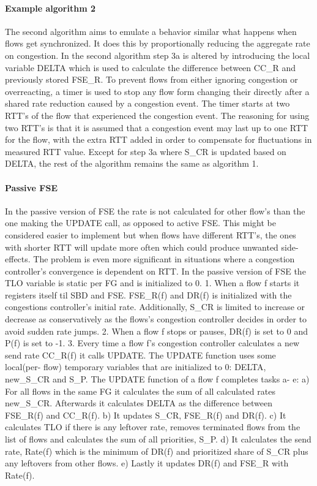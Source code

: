 \documentclass[UKenglish]{ifimaster}
\begin{document}
\paragraph{Example algorithm 2}
The second algorithm aims to emulate a behavior similar what happens when flows get synchronized.
It does this by proportionally reducing the aggregate rate on congestion.
In the second algorithm step 3a is altered by introducing the local variable DELTA which is used to calculate the difference between CC\_R and previously stored FSE\_R. 
To prevent flows from either ignoring congestion or overreacting, a timer is used to stop any flow form changing their directly after a shared rate reduction caused by a congestion event. 
The timer starts at two RTT's of the flow that experienced the congestion event.
The reasoning for using two RTT's is that it is assumed that a congestion event may last up to one RTT for the flow, with the extra RTT added in order to compensate for fluctuations in measured RTT value.
Except for step 3a where S\_CR is updated based on DELTA, the rest of the algorithm remains the same as algorithm 1.

\paragraph{Passive FSE}
In the passive version of FSE the rate is not calculated for other flow's than the one making the UPDATE call, as opposed to active FSE.
This might be considered easier to implement but when flows have different RTT's, the ones with shorter RTT will update more often which could produce unwanted side- effects.
The problem is even more significant in situations where a congestion controller's convergence is dependent on RTT. %
In the passive version of FSE the TLO variable is static per FG and is initialized to 0. 
1. When a flow f starts it registers itself til SBD and FSE. FSE\_R(f) and DR(f) is initialized with the congestions controller's initial rate. 
Additionally, S\_CR is limited to increase or decrease as conservatively as the flows's congestion controller decides in order to avoid sudden rate jumps.
2. When a flow f stops or pauses, DR(f) is set to 0 and P(f) is set to -1. %
3. Every time a flow f's congestion controller calculates a new send rate CC\_R(f) it calls UPDATE.
The UPDATE function uses some local(per- flow) temporary variables that are initialized to 0: DELTA, new\_S\_CR and S\_P.
The UPDATE function of a flow f completes tasks a- e:
a) For all flows in the same FG it calculates the sum of all calculated rates new\_S\_CR.
Afterwards it calculates DELTA as the difference between FSE\_R(f) and CC\_R(f).
b) It updates S\_CR, FSE\_R(f) and DR(f).
c) It calculates TLO if there is any leftover rate, removes terminated flows from the list of flows and calculates the sum of all priorities, S\_P.
d) It calculates the send rate, Rate(f) which is the minimum of DR(f) and prioritized share of S\_CR plus any leftovers from other flows.
e) Lastly it updates DR(f) and FSE\_R with Rate(f).
\end{document}
